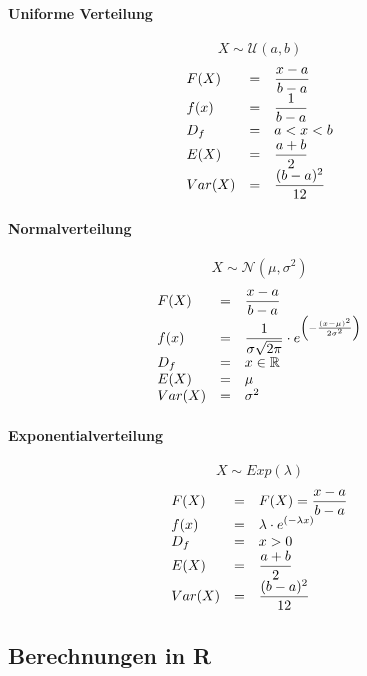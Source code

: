 \paragraph{Uniforme Verteilung}
\[ X \sim \mathcal{U}(a,b) \]
\[ \begin{array}{l c l}
	F(X) 
		& =
		& \displaystyle \frac{x-a}{b-a} \\
	f(x)	
		& =
		& \displaystyle \frac{1}{b-a}  \\
	D_f	
		& = 
		& a < x < b \\
	E(X)
		& = 
		& \displaystyle \frac{a+b}{2}\\
	Var(X)	
		& =
		& \displaystyle \frac{(b-a)^2}{12}\\
\end{array} \]

\paragraph{Normalverteilung}
\[ X \sim \mathcal{N}(\mu, \sigma^2) \]
\[ \begin{array}{l c l}
	F(X) 
		& =
		& \displaystyle \frac{x-a}{b-a} \\
	f(x)	
		& =
		& \displaystyle \frac{1}{\sigma\sqrt{2\pi}} \cdot
				e^{\left(
					-\frac{(x-\mu)^2}{2\sigma^2}
				\right)} \\
	D_f	
		& = 
		& x \in \mathbb{R} \\
	E(X)
		& = 
		& \mu\\
	Var(X)	
		& =
		& \sigma^2 \\
\end{array} \]

\paragraph{Exponentialverteilung}
\[ X \sim Exp(\lambda) \]
\[ \begin{array}{l c l}
	F(X) 
		& =
		& F(X) = \displaystyle \frac{x-a}{b-a} \\
	f(x)	
		& =
		& \displaystyle \lambda \cdot 
				e^{\left(
					-\lambda x
				\right)} \\
	D_f	
		& = 
		& x > 0 \\
	E(X)
		& = 
		& \displaystyle \frac{a+b}{2}\\
	Var(X)	
		& =
		& \displaystyle \frac{(b-a)^2}{12}\\
\end{array} \]


\subsection{Berechnungen in R}
